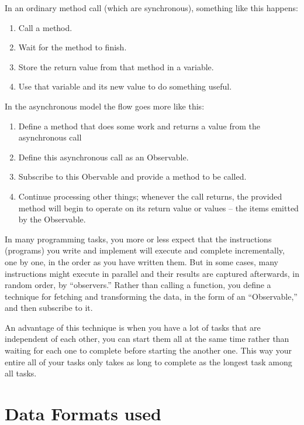 	
\hspace*{0.2in}In an ordinary method call (which are synchronous), something like this happens:
\begin{enumerate}
\item Call a method.
\item Wait for the method to finish.
\item Store the return value from that method in a variable.
\item Use that variable and its new value to do something useful.
\end{enumerate}

\hspace*{0.2in}In the asynchronous model the flow goes more like this:
\begin{enumerate}
\item Define a method that does some work and returns a value from the asynchronous call
\item Define this asynchronous call as an Observable.
\item Subscribe to this Obervable and provide a method to be called.
\item Continue processing other things; whenever the call returns, the provided method will begin to operate on its return value or values -- the items emitted by the Observable.
\end{enumerate}


In many programming tasks, you more or less expect that the instructions (programs) you write and implement will execute and complete incrementally, one by one, in the order as you have written them. But in some cases, many instructions might execute in parallel and their results are captured afterwards, in random order, by “observers.” Rather than calling a function, you define a technique for fetching and transforming the data, in the form of an “Observable,” and then subscribe to it.

An advantage of this technique is when you have a lot  of tasks that are  independent of each other, you can start them all at the same time rather than waiting for each one to complete before starting the another one. This way your entire all of your tasks only takes as long to complete as the longest task among all tasks.



\section{Data Formats used }

